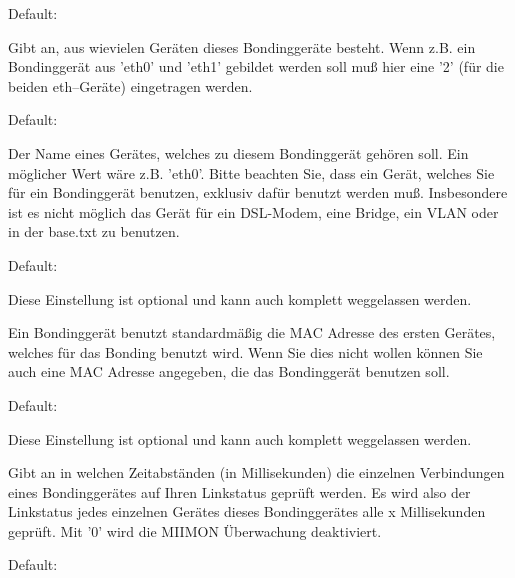 \begin{description}
\begin{description}
\end{description}


  Default: 

  Gibt an, aus wievielen Geräten dieses Bondinggeräte besteht. Wenn
  z.B. ein Bondinggerät aus 'eth0' und 'eth1' gebildet werden soll
  muß hier eine '2' (für die beiden eth--Geräte) eingetragen werden.


  Default: 

  Der Name eines Gerätes, welches zu diesem Bondinggerät gehören
  soll. Ein möglicher Wert wäre z.B. 'eth0'. Bitte beachten Sie, dass
  ein Gerät, welches Sie für ein Bondinggerät benutzen, exklusiv dafür
  benutzt werden muß. Insbesondere ist es nicht möglich das Gerät für
  ein DSL-Modem, eine Bridge, ein VLAN oder in der base.txt zu
  benutzen.


  Default: 

  Diese Einstellung ist optional und kann auch komplett weggelassen
  werden.

  Ein Bondinggerät benutzt standardmäßig die MAC Adresse des ersten
  Gerätes, welches für das Bonding benutzt wird. Wenn Sie dies nicht
  wollen können Sie auch eine MAC Adresse angegeben, die das
  Bondinggerät benutzen soll.


  Default: 

  Diese Einstellung ist optional und kann auch komplett weggelassen
  werden.

  Gibt an in welchen Zeitabständen (in Millisekunden) die einzelnen
  Verbindungen eines Bondinggerätes auf Ihren Linkstatus geprüft
  werden. Es wird also der Linkstatus jedes einzelnen Gerätes dieses
  Bondinggerätes alle x Millisekunden geprüft. Mit '0' wird die MIIMON
  Überwachung deaktiviert.


  Default: 


\end{description}
